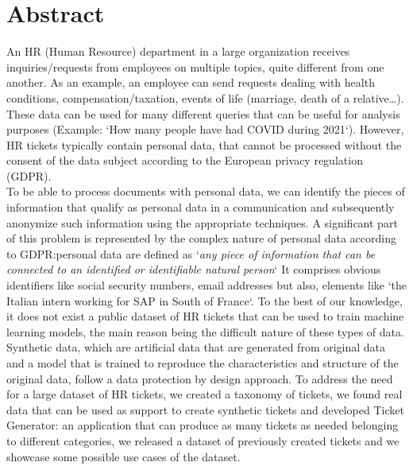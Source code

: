 \chapter*{Abstract}

An HR (Human Resource) department in a large organization receives inquiries\slash requests from employees on multiple topics, quite different from one another. As an example, an employee can send requests dealing with health conditions, compensation/taxation, events of life (marriage, death of a relative\dots). \\
These data can be used for many different queries that can be useful for analysis purposes (Example: `How many people have had COVID during 2021`). However, HR tickets typically contain personal data, that cannot be processed without the consent of the data subject according to the European privacy regulation (GDPR). \\
To be able to process documents with personal data, we can identify the pieces of information that qualify as personal data in a communication and subsequently anonymize such information using the appropriate techniques.
A significant part of this problem is represented by the complex nature of personal data according to GDPR:\@ personal data are defined as `\textit{any piece of information that can be connected to an identified or identifiable natural person}` It comprises obvious identifiers like social security numbers, email addresses but also, elements like `the Italian intern working for SAP in South of France`.
To the best of our knowledge, it does not exist a public dataset of HR tickets that can be used to train machine learning models, the main reason being the difficult nature of these types of data. Synthetic data, which are artificial data that are generated from original data and a model that is trained to reproduce the characteristics and structure of the original data, follow a data protection by design approach.
To address the need for a large dataset of HR tickets, we created a taxonomy of tickets, we found real data that can be used as support to create synthetic tickets and developed Ticket Generator: an application that can produce as many tickets as needed belonging to different categories, we released a dataset of previously created tickets and we showcase some possible use cases of the dataset.

